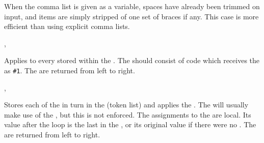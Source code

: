 \documentclass[oneside]{book}
\begin{document}
When the comma list is given as a variable, spaces
have already been trimmed on input, and items are simply stripped
of one set of braces if any. This case is more efficient than using
explicit comma lists.


\begin{function}{\clistMapInline,\clistVarMapInline}
\begin{syntax}
  
  
\end{syntax}
Applies  to every  stored
within the . The  should
consist of code which receives the  as \verb|#1|.
The  are returned from left to right.
\begin{demohigh}
\IgnoreSpacesOn
\tlClear \lTmpaTl
{} {
  \tlPutRight {}
}
\tlUse \lTmpaTl
\IgnoreSpacesOff
\end{demohigh}
\end{function}

\begin{function}{\clistMapVariable,\clistVarMapVariable}
\begin{syntax}
   
   
\end{syntax}
Stores each  of the  in turn in the
(token list)  and applies the .  The
 will usually make use of the , but this
is not enforced.  The assignments to the  are local.
Its value after the loop is the last  in the , or its original value if there were no .  The
 are returned from left to right.
\begin{demohigh}
\IgnoreSpacesOn
{} \lTmpiTl {
  \tlPutRight \gTmpaTl {\expWhole {(\lTmpiTl)}}
}
\tlUse \gTmpaTl
\IgnoreSpacesOff
\end{demohigh}
\end{function}
\end{document}
